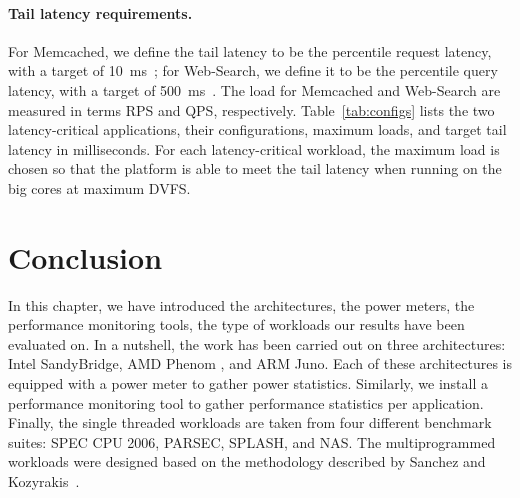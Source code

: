 \paragraph{Tail latency requirements.} For Memcached, we define the tail latency to be the
\ninefive percentile request latency, with a target of
\SI{10}{\milli\second}~\citep{Lo2014TowardsWorkloads,Ferdman2012ClearingClouds}; for
Web-Search, we define it to be the \ninezero percentile query latency, with a target of
\SI{500}{\milli\second}~\citep{Ferdman2012ClearingClouds}. The load for Memcached and
Web-Search are measured in terms RPS and QPS, respectively.  Table~\ref{tab:configs} lists
the two latency-critical applications, their configurations, maximum loads, and target
tail latency in milliseconds. For each latency-critical workload, the maximum load is
chosen so that the platform is able to meet the tail latency when running on the big cores
at maximum DVFS.





\section{Conclusion} \label{section: chap2conclusion}  

In this chapter, we have introduced the architectures, the power meters, the performance
monitoring tools, the type of workloads our results have been evaluated on. In a nutshell,
the work has been carried out on three  architectures: Intel SandyBridge,
AMD Phenom , and ARM Juno. Each of these architectures is equipped with a power
meter to gather power statistics. Similarly, we install a performance monitoring tool to
gather performance statistics per application.  Finally, the single threaded workloads are
taken from four different benchmark suites: SPEC CPU 2006, PARSEC, SPLASH, and NAS. The
multiprogrammed workloads were designed based on the methodology described by Sanchez and
Kozyrakis~\citep{Sanchez:2011:VSE:2000064.2000073}.





